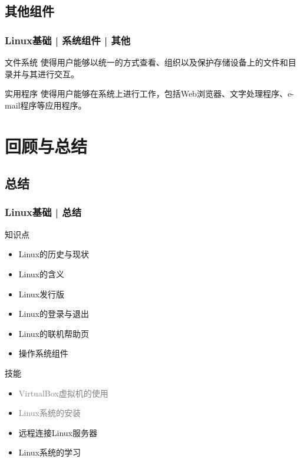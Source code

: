 \subsection{其他组件}
\begin{frame}
  \frametitle{Linux基础 | 系统组件 | 其他}
  \begin{block}{文件系统}
    使得用户能够以统一的方式查看、组织以及保护存储设备上的文件和目录并与其进行交互。
  \end{block}
  \pause
  \begin{block}{实用程序}
    使得用户能够在系统上进行工作，包括Web浏览器、文字处理程序、e-mail程序等应用程序。
  \end{block}
\end{frame}

\section{回顾与总结}
\subsection{总结}
\begin{frame}
  \frametitle{Linux基础 | 总结}
  \begin{block}{知识点}
    \begin{itemize}
      \item Linux的历史与现状
      \item Linux的含义
      \item Linux发行版
      \item Linux的登录与退出
      \item Linux的联机帮助页
      \item 操作系统组件
    \end{itemize}
  \end{block}
  \begin{block}{技能}
    \begin{itemize}
      \item \textcolor{gray}{VirtualBox虚拟机的使用}
      \item \textcolor{gray}{Linux系统的安装}
      \item 远程连接Linux服务器
      \item Linux系统的学习
    \end{itemize}
  \end{block}
\end{frame}

